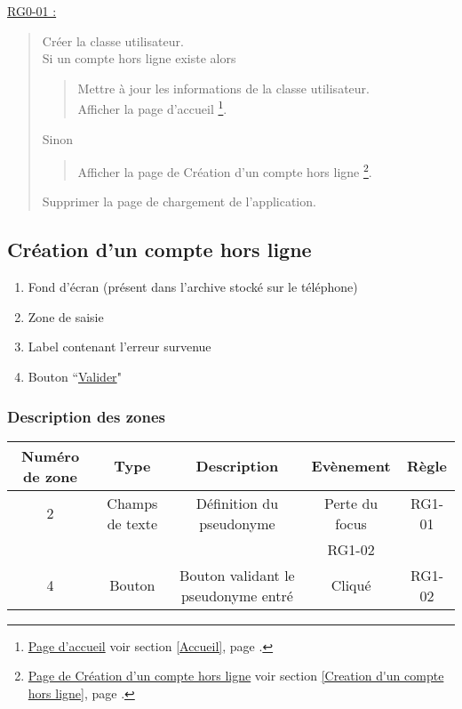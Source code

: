 \documentclass{report}
\begin{document}
		\underline{RG0-01 :}
		\begin{quote}
			Créer la classe utilisateur.\\
			Si un compte hors ligne existe alors
			\begin{quote}
				Mettre à jour les informations de la classe utilisateur.\\
				Afficher la page d'accueil%
				\footnote[1]{
					\hyperlink{Page d'accueil}{Page d'accueil}
					\og voir section \ref{Accueil}, page \pageref{Accueil}.\fg
				}.
			\end{quote}
			Sinon
			\begin{quote}
				Afficher la page de Création d'un compte hors ligne%
				\footnote[2]{
					\hyperlink{Création d'un compte hors ligne}{Page de Création d'un compte hors ligne}
					\og voir section \ref{Creation d'un compte hors ligne},	page \pageref{Creation d'un compte hors ligne}.\fg
				}.
			\end{quote}
			Supprimer la page de chargement de l'application.
		\end{quote}
	
\newpage

	\subsection{Création d'un compte hors ligne}
		\hypertarget{Creation d'un compte hors ligne}{}
		\label{Creation d'un compte hors ligne}

		\begin{center}
			
		\end{center}

		\begin{enumerate}
		  \item Fond d'écran (présent dans l'archive stocké sur le téléphone)
		  \item Zone de saisie
		  \item Label contenant l’erreur survenue
		  \item Bouton ``\hyperlink{Accueil}{Valider}"
		\end{enumerate}

		\subsubsection{Description des zones}
				
			\begin{tabular}{|c|c|c|c|c|} \hline
				Numéro de zone & Type  & Description & Evènement &	Règle \\\hline 
				2 & Champs de texte & Définition du pseudonyme & Perte du focus & RG1-01 \\
				  &                 &                          & RG1-02         & \\\hline
				4 & Bouton          & Bouton validant le pseudonyme entré & Cliqué & RG1-02 \\\hline
			\end{tabular}
\end{document}
